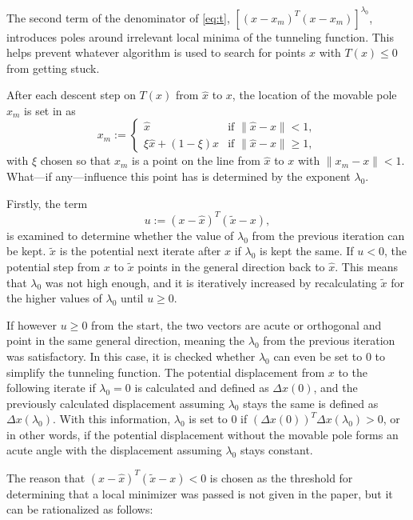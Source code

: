 \documentclass[a4paper,12pt,twoside]{article}
\begin{document}
The second term of the denominator of \eqref{eq:t}, $[(x-x_m)^T(x-x_m)]^{\lambda_0}$, introduces poles around irrelevant local minima of the tunneling function. This helps prevent whatever algorithm is used to search for points $x$ with $T(x) \leq 0$ from getting stuck. 

After each descent step on $T(x)$ from $\hat x$ to $x$, the location of the movable pole $x_m$ is set in \cite[Eq. A.7]{levy_tunneling_1985} as 
\begin{equation}\label{eq:xm}
    x_m:=\begin{cases}
        \hat{x} & \text{if } \|\hat{x}-x\| < 1, \\ 
        \xi\hat{x} + (1-\xi)x & \text{if } \|\hat{x}-x\| \geq 1,
    \end{cases}
\end{equation}
with $\xi$ chosen so that $x_m$ is a point on the line from $\hat x$ to $x$ with $\|x_m - x\| < 1$. What—if any—influence this point has is determined by the exponent $\lambda_0$. 

Firstly, the term \cite[Eq. A.8]{levy_tunneling_1985}
\begin{equation}
u := (x-\hat x)^T(\tilde x - x),
\end{equation}
is examined to determine whether the value of $\lambda_0$ from the previous iteration can be kept. $\tilde x$ is the potential next iterate after $x$ if $\lambda_0$ is kept the same. If $u<0$, the potential step from $x$ to $\tilde x$ points in the general direction back to $\hat x$. This means that $\lambda_0$ was not high enough, and it is iteratively increased by recalculating $\tilde x$ for the higher values of $\lambda_0$ until $u \geq 0$.

If however $u \geq 0$ from the start, the two vectors are acute or orthogonal and point in the same general direction, meaning the $\lambda_0$ from the previous iteration was satisfactory. In this case, it is checked whether $\lambda_0$ can even be set to $0$ to simplify the tunneling function. The potential displacement from $x$ to the following iterate if $\lambda_0 = 0$ is calculated and defined as $\Delta x(0)$, and the previously calculated displacement assuming $\lambda_0$ stays the same is defined as $\Delta x(\lambda_0)$. With this information, $\lambda_0$ is set to $0$ if $(\Delta x(0))^T\Delta x(\lambda_0) > 0$, or in other words, if the potential displacement without the movable pole forms an acute angle with the displacement assuming $\lambda_0$ stays constant. 

The reason that $(x-\hat x)^T(\tilde x - x) < 0$ is chosen as the threshold for determining that a local minimizer was passed is not given in the paper, but it can be rationalized as follows:
\end{document}

